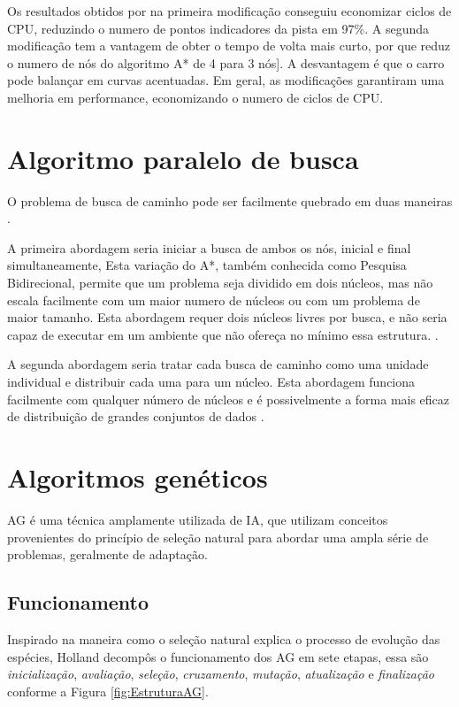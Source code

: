 Os resultados obtidos por \cite{JungTing} na primeira modificação conseguiu economizar ciclos de CPU, reduzindo o numero de pontos indicadores da pista em 97\%. A segunda modificação tem a vantagem de obter o tempo de volta mais curto, por que reduz o numero de nós do algoritmo A* de 4 para 3 nós]. A desvantagem é que o carro pode balançar em curvas acentuadas. Em geral, as modificações garantiram uma melhoria em performance, economizando o numero de ciclos de CPU.


\section{Algoritmo paralelo de busca}

O problema de busca de caminho pode ser facilmente quebrado em duas maneiras \cite{WilliamMiller}.

A primeira abordagem seria iniciar a busca  de ambos os nós, inicial e final simultaneamente, Esta variação do A*, também conhecida como Pesquisa Bidirecional, permite que um problema seja dividido em dois núcleos, mas não escala facilmente com um maior numero de núcleos ou com um problema de maior tamanho. Esta abordagem requer dois núcleos livres por busca, e não seria capaz de executar em um ambiente que não ofereça no mínimo essa estrutura. \cite{Janie_Chang}.

A segunda abordagem seria tratar cada busca de caminho como uma unidade individual e distribuir cada uma para um núcleo.
Esta abordagem funciona facilmente com qualquer número de núcleos e é possivelmente a forma mais eficaz de distribuição de grandes conjuntos de dados \cite{Jad} \cite{WilliamMiller}.


\section{Algoritmos genéticos}

AG é uma técnica amplamente utilizada de IA, que utilizam conceitos provenientes do princípio de seleção natural para abordar uma  ampla série de problemas, geralmente de adaptação. \cite{DiogoCLucas}

\subsection{Funcionamento}
 
Inspirado na maneira como o seleção natural explica o processo de evolução das espécies, Holland \cite{Holland1975} decompôs o funcionamento dos AG em sete etapas, essa são \textit{inicialização}, \textit{avaliação}, \textit{seleção}, \textit{cruzamento}, \textit{mutação}, \textit{atualização} e  \textit{finalização} conforme a Figura \ref{fig:EstruturaAG}. 

